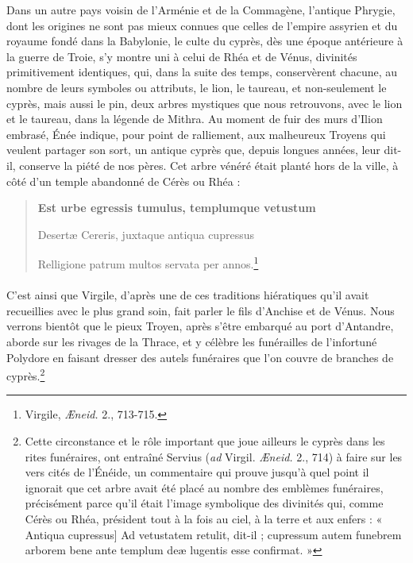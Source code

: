 \documentclass{article}
\begin{document}
Dans un autre pays voisin de l'Arménie et de la Commagène, l'antique Phrygie, dont les origines ne sont pas mieux connues que celles de l'empire assyrien et du royaume fondé dans la Babylonie, le culte du cyprès, dès une époque antérieure à la guerre de Troie, s'y montre uni à celui de Rhéa et de Vénus, divinités primitivement identiques, qui, dans la suite des temps, conservèrent chacune, au nombre de leurs symboles ou attributs, le lion, le taureau, et non-seulement le cyprès, mais aussi le pin, deux arbres mystiques que nous retrouvons, avec le lion et le taureau, dans la légende de Mithra. Au moment de fuir des murs d'Ilion embrasé, Énée indique, pour point de ralliement, aux malheureux Troyens qui veulent partager son sort, un antique cyprès que, depuis longues années, leur dit-il, conserve la piété de nos pères. Cet arbre vénéré était planté hors de la ville, à côté d'un temple abandonné de Cérès ou Rhéa :

\begin{quotation}\scriptsize\bfseries
Est urbe egressis tumulus, templumque vetustum

Desertæ Cereris, juxtaque antiqua cupressus

Relligione patrum multos servata per annos.\footnote{Virgile, \emph{Æneid.} 2., 713-715.}
\end{quotation}

\paragraph{}
C'est ainsi que Virgile, d'après une de ces traditions hiératiques qu'il avait recueillies avec le plus grand soin, fait parler le fils d'Anchise et de Vénus. Nous verrons bientôt que le pieux Troyen, après s'être embarqué au port d'Antandre, aborde sur les rivages de la Thrace, et y célèbre les funérailles de l'infortuné Polydore en faisant dresser des autels funéraires que l'on couvre de branches de cyprès.\footnote{Cette circonstance et le rôle important que joue ailleurs le cyprès dans les rites funéraires, ont entraîné Servius (\emph{ad} Virgil. \emph{Æneid.} 2., 714) à faire sur les vers cités de l'Énéide, un commentaire qui prouve jusqu'à quel point il ignorait que cet arbre avait été placé au nombre des emblèmes funéraires, précisément parce qu'il était l'image symbolique des divinités qui, comme Cérès ou Rhéa, président tout à la fois au ciel, à la terre et aux enfers : « Antiqua cupressus] Ad vetustatem retulit, dit-il ; cupressum autem funebrem arborem bene ante templum deæ lugentis esse confirmat. »}
\end{document}
